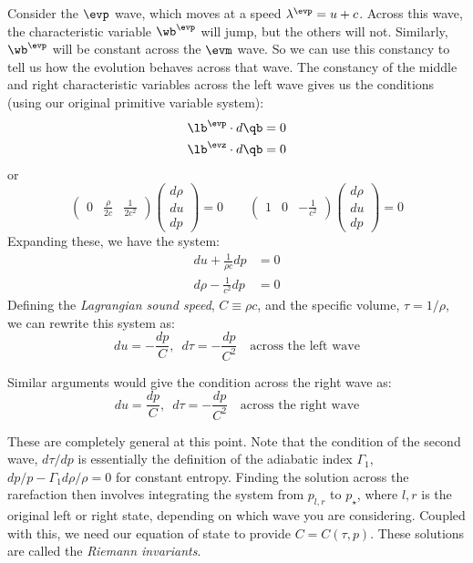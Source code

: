 Consider the $\evp$ wave, which moves at a speed $\lambda^\evp = u
+c$.  Across this wave, the characteristic variable $\wb^\evp$ will
jump, but the others will not.  Similarly, $\wb^\evp$ will be constant
across the $\evm$ wave.  So we can use this constancy to tell us how
the evolution behaves across that wave.  The constancy of the middle and right characteristic variables across the left
wave gives us the conditions (using our original primitive variable system):
\begin{align}
\lb^\evp \cdot d\qb &= 0 \\
\lb^\evz \cdot d\qb &= 0
\end{align}
or
\begin{equation}
\left ( \begin{array}{ccc} 0 & \frac{\rho}{2c} & \frac{1}{2c^2} \end{array} \right)
   \left ( \begin{array}{c} d\rho \\ du \\ dp \end{array} \right ) = 0
\qquad
%
\left ( \begin{array}{ccc} 1 & 0 & -\frac{1}{c^2} \end{array} \right)
   \left ( \begin{array}{c} d\rho \\ du \\ dp \end{array} \right ) = 0
\end{equation}
Expanding these, we have the system:
\begin{align}
du + \frac{1}{\rho c} dp &= 0 \\
d\rho - \frac{1}{c^2} dp &= 0
\end{align}
Defining the {\em Lagrangian sound speed}, $C \equiv \rho c$, and the
specific volume, $\tau = 1/\rho$, we can rewrite this system as:
\begin{equation}
du = -\frac{dp}{C} , \,\,\, d\tau = -\frac{dp}{C^2} \quad \mbox{across the left wave}
\end{equation}

Similar arguments would give the condition across the right wave as:
\begin{equation}
du = \frac{dp}{C} , \,\,\, d\tau = -\frac{dp}{C^2} \quad \mbox{across the right wave}
\end{equation}

These are completely general at this point.  Note that the condition
of the second wave, $d\tau/dp$ is essentially the definition of the
adiabatic index $\Gamma_1$, $dp/p - \Gamma_1 d\rho/\rho = 0$ for
constant entropy.  Finding the solution across the rarefaction then
involves integrating the system from $p_{l,r}$ to $p_\star$, where $l,
r$ is the original left or right state, depending on which wave you
are considering.  Coupled with this, we need our equation of state to
provide $C = C(\tau, p)$.  These solutions are called the {\em Riemann
  invariants}.

